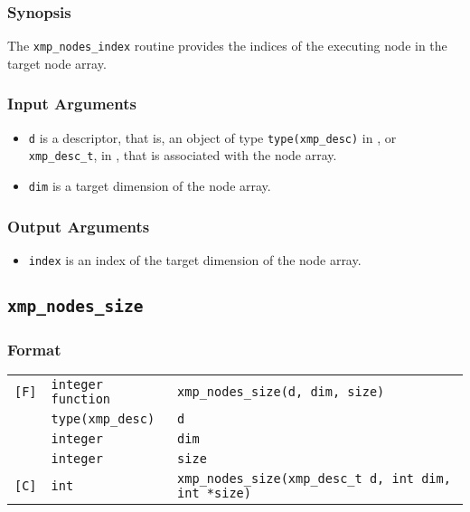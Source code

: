 \subsubsection*{Synopsis}

The {\tt xmp\_nodes\_index} routine provides the indices of the
executing node in the target node array.

\subsubsection*{Input Arguments}

\begin{itemize}
 \item {\tt d} is a descriptor, that is, an object of type 
       {\tt type(xmp\_desc)} in {\XMPF}, or {\tt xmp\_desc\_t},
       in {\XMPC}, that is associated with the node array.
 \item {\tt dim} is a target dimension of the node array.
\end{itemize}

\subsubsection*{Output Arguments}

\begin{itemize}
 \item {\tt index} is an index of the target dimension of the node array.
\end{itemize}


\subsection{\tt xmp\_nodes\_size}

\subsubsection*{Format}

\begin{tabular}{lll}

\verb![F]!& {\tt integer function}& {\tt xmp\_nodes\_size(d, dim, size)}\\
          & {\tt type(xmp\_desc)} & {\tt d}\\
          & {\tt integer} & {\tt dim}\\
          & {\tt integer} & {\tt size}\\

\verb![C]!&  {\tt int}& {\tt xmp\_nodes\_size(xmp\_desc\_t d, int dim, int *size)}\\

\end{tabular}

